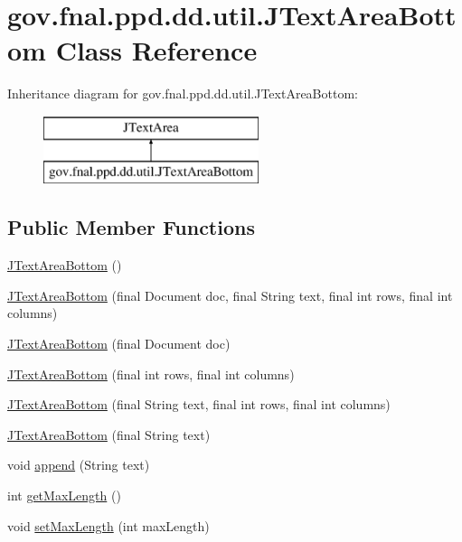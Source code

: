 \hypertarget{classgov_1_1fnal_1_1ppd_1_1dd_1_1util_1_1JTextAreaBottom}{\section{gov.\-fnal.\-ppd.\-dd.\-util.\-J\-Text\-Area\-Bottom Class Reference}
\label{classgov_1_1fnal_1_1ppd_1_1dd_1_1util_1_1JTextAreaBottom}
}
Inheritance diagram for gov.\-fnal.\-ppd.\-dd.\-util.\-J\-Text\-Area\-Bottom\-:\begin{figure}[H]
\begin{center}
\leavevmode
\includegraphics[height=2.000000cm]{classgov_1_1fnal_1_1ppd_1_1dd_1_1util_1_1JTextAreaBottom}
\end{center}
\end{figure}
\subsection*{Public Member Functions}
\begin{DoxyCompactItemize}
\item 
\hyperlink{classgov_1_1fnal_1_1ppd_1_1dd_1_1util_1_1JTextAreaBottom_a8ef63446bbf050fc3e0befd1978e0d1a}{J\-Text\-Area\-Bottom} ()
\item 
\hyperlink{classgov_1_1fnal_1_1ppd_1_1dd_1_1util_1_1JTextAreaBottom_ad837bb4b22ba98b7664fbd9d70a3e7d0}{J\-Text\-Area\-Bottom} (final Document doc, final String text, final int rows, final int columns)
\item 
\hyperlink{classgov_1_1fnal_1_1ppd_1_1dd_1_1util_1_1JTextAreaBottom_a649ca51be0f9fa14b733f94854b696ed}{J\-Text\-Area\-Bottom} (final Document doc)
\item 
\hyperlink{classgov_1_1fnal_1_1ppd_1_1dd_1_1util_1_1JTextAreaBottom_aa95475b0e2c11a17cd19b03c6d0c2b1e}{J\-Text\-Area\-Bottom} (final int rows, final int columns)
\item 
\hyperlink{classgov_1_1fnal_1_1ppd_1_1dd_1_1util_1_1JTextAreaBottom_a096c66d8d188af90295b4142a484ee74}{J\-Text\-Area\-Bottom} (final String text, final int rows, final int columns)
\item 
\hyperlink{classgov_1_1fnal_1_1ppd_1_1dd_1_1util_1_1JTextAreaBottom_a6bfb990c4ecb4dce347a73e08ac226a3}{J\-Text\-Area\-Bottom} (final String text)
\item 
void \hyperlink{classgov_1_1fnal_1_1ppd_1_1dd_1_1util_1_1JTextAreaBottom_a07de6bfc1427baef9ab2710999a8cd07}{append} (String text)
\item 
int \hyperlink{classgov_1_1fnal_1_1ppd_1_1dd_1_1util_1_1JTextAreaBottom_a9e58641bde331da6bb9bb246b87bdc42}{get\-Max\-Length} ()
\item 
void \hyperlink{classgov_1_1fnal_1_1ppd_1_1dd_1_1util_1_1JTextAreaBottom_a31093b799625b0aa5a264be451af489e}{set\-Max\-Length} (int max\-Length)
\end{DoxyCompactItemize}



